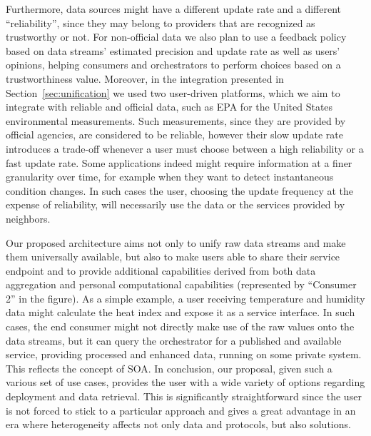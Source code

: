 Furthermore, data sources might have a different update rate and a different ``reliability'', since they may belong to providers that are recognized as trustworthy or not.
For non-official data we also plan to use a feedback policy based on data streams' estimated precision and update rate as well as users' opinions, helping consumers and orchestrators to perform choices based on a trustworthiness value. 
Moreover, in the integration presented in Section~\ref{sec:unification} we used two user-driven platforms, which we aim to integrate with reliable and official data, such as EPA for the United States environmental measurements.
Such measurements, since they are provided by official agencies, are considered to be reliable, however their slow update rate introduces a trade-off whenever a user must choose between a high reliability or a fast update rate.
Some applications indeed might require information at a finer granularity over time, for example when they want to detect instantaneous condition changes.
In such cases the user, choosing the update frequency at the expense of reliability, will necessarily use the data or the services provided by neighbors.

Our proposed architecture aims not only to unify raw data streams and make them universally available, but also to make users able to share their service endpoint and to provide additional capabilities derived from both data aggregation and personal computational capabilities (represented by ``Consumer 2'' in the figure).
As a simple example, a user receiving temperature and humidity data might calculate the heat index and expose it as a service interface.
In such cases, the end consumer might not directly make use of the raw values onto the data streams, but it can query the orchestrator for a published and available service, providing processed and enhanced data, running on some private system.
This reflects the concept of SOA.
In conclusion, our proposal, given such a various set of use cases, provides the user with a wide variety of options regarding deployment and data retrieval.
This is significantly straightforward since the user is not forced to stick to a particular approach and gives a great advantage in an era where heterogeneity affects not only data and protocols, but also solutions.